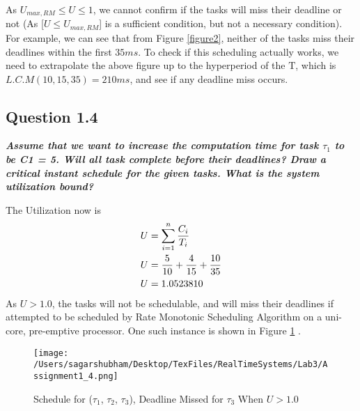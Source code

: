 \documentclass[oneside,a4paper]{article}
\newcommand{\Tau}{\mathrm{T}}
\begin{document}
As $U_{max, RM} \leq U \leq 1$, we cannot confirm if the tasks will miss their deadline or not (As [$U \leq U_{max, RM}$] is a sufficient condition, but not a necessary condition). For example, we can see that from Figure \ref{figure2}, neither of the tasks miss their deadlines within the first $35 ms $. To check if this scheduling actually works, we need to extrapolate the above figure up to the hyperperiod of the $\Tau$, which is $L.C.M(10,15,35) = 210 ms$, and see if any deadline miss occurs.
\pagebreak
\subsection*{\normalsize{Question 1.4}}
\textit{\textbf{Assume that we want to increase the computation time for task $\tau_1$ to be C1 = 5. Will all task complete before their deadlines? Draw a critical instant schedule for the given tasks. What is the system utilization bound?}}\par

The Utilization now is 
\begin{align*}
& U = \sum_{i=1}^{n} \frac{C_i}{T_i}  \\ 
& U = \frac{5}{10} + \frac{4}{15} + \frac{10}{35}\\
& U = 1.0523810 \hfill\\
\end{align*}
As $U > 1.0$, the tasks will not be schedulable, and will miss their deadlines if attempted to be scheduled by Rate Monotonic Scheduling Algorithm on a uni-core, pre-emptive processor. One such instance is shown in Figure \ref{figure3} .
\begin{figure}[H]
                    \centering
                    \texttt{[image: /Users/sagarshubham/Desktop/TexFiles/RealTimeSystems/Lab3/Assignment1\_4.png]}
                    \caption[Figure for Question 1.4]{Schedule for ($\tau_1$, $\tau_2$, $\tau_3$), Deadline Missed for $\tau_3$ When $U > 1.0$}
                    \label{figure3}        
\end{figure}\par
\pagebreak
\end{document}
